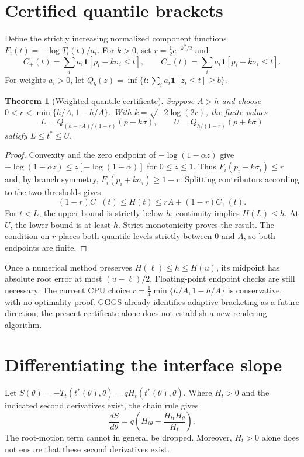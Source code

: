 \documentclass[11pt,a4paper]{article}
\newtheorem{theorem}{Theorem}
\newcommand{\ind}{\mathbf{1}}
\begin{document}
\section{Certified quantile brackets}
Define the strictly increasing normalized component functions
$F_i(t)=-\log T_i(t)/a_i$. For $k>0$, set $r=\tfrac12 e^{-k^2/2}$ and
\[
 C_+(t)=\sum_i a_i\ind[p_i-k\sigma_i\leq t],
 \qquad
 C_-(t)=\sum_i a_i\ind[p_i+k\sigma_i\leq t].
\]
For weights $a_i>0$, let
$Q_b(z)=\inf\{t:\sum_i a_i\ind[z_i\leq t]\geq b\}$.
\begin{theorem}[Weighted-quantile certificate]
Suppose $A>h$ and choose
$0<r<\min\{h/A,1-h/A\}$. With $k=\sqrt{-2\log(2r)}$, the finite values
\[
 L=Q_{(h-rA)/(1-r)}(p-k\sigma),\qquad
 U=Q_{h/(1-r)}(p+k\sigma)
\]
satisfy $L\leq t^*\leq U$.
\end{theorem}
\begin{proof}
Convexity and the zero endpoint of $-\log(1-\alpha z)$ give
$-\log(1-\alpha z)\leq z[-\log(1-\alpha)]$ for $0\leq z\leq1$.
Thus $F_i(p_i-k\sigma_i)\leq r$ and, by branch symmetry,
$F_i(p_i+k\sigma_i)\geq1-r$. Splitting contributors according to the two
thresholds gives
\[
 (1-r)C_-(t)\leq H(t)\leq rA+(1-r)C_+(t).
\]
For $t<L$, the upper bound is strictly below $h$; continuity implies
$H(L)\leq h$. At $U$, the lower bound is at least $h$.
Strict monotonicity proves the result. The condition on $r$ places both
quantile levels strictly between $0$ and $A$, so both endpoints are finite.
\end{proof}
Once a numerical method preserves $H(\ell)\leq h\leq H(u)$, its midpoint
has absolute root error at most $(u-\ell)/2$. Floating-point endpoint checks
are still necessary. The current CPU choice
$r=\tfrac14\min\{h/A,1-h/A\}$ is conservative, with no optimality proof.
GGGS already identifies adaptive bracketing as a future direction; the present
certificate alone does not establish a new rendering algorithm.

\section{Differentiating the interface slope}
Let $S(\theta)=-T_t(t^*(\theta),\theta)=qH_t(t^*(\theta),\theta)$.
Where $H_t>0$ and the indicated second derivatives exist, the chain rule gives
\[
 \frac{dS}{d\theta}
 =q\left(H_{t\theta}-\frac{H_{tt}H_\theta}{H_t}\right).
\]
The root-motion term cannot in general be dropped. Moreover, $H_t>0$ alone
does not ensure that these second derivatives exist.
\end{document}
